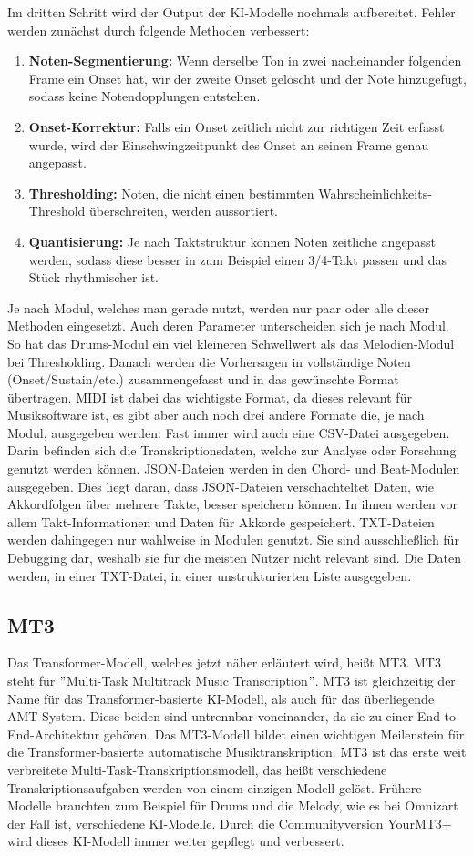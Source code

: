 Im dritten Schritt wird der Output der KI-Modelle nochmals aufbereitet.
Fehler werden zunächst durch folgende Methoden verbessert:
\begin{enumerate}
    \item \textbf{Noten-Segmentierung:} Wenn derselbe Ton in zwei nacheinander folgenden Frame ein Onset hat, wir der zweite Onset gelöscht und der Note hinzugefügt, sodass keine Notendopplungen entstehen.
    \item \textbf{Onset-Korrektur:} Falls ein Onset zeitlich nicht zur richtigen Zeit erfasst wurde, wird der Einschwingzeitpunkt des Onset an seinen Frame genau angepasst.
    \item \textbf{Thresholding:} Noten, die nicht einen bestimmten Wahrscheinlichkeits-Threshold überschreiten, werden aussortiert.
    \item \textbf{Quantisierung:} Je nach Taktstruktur können Noten zeitliche angepasst werden, sodass diese besser in zum Beispiel einen 3/4-Takt passen und das Stück rhythmischer ist.
\end{enumerate}
Je nach Modul, welches man gerade nutzt, werden nur paar oder alle dieser Methoden eingesetzt.
Auch deren Parameter unterscheiden sich je nach Modul.
So hat das Drums-Modul ein viel kleineren Schwellwert als das Melodien-Modul bei Thresholding.
Danach werden die Vorhersagen in vollständige Noten (Onset/Sustain/etc.)
zusammengefasst und in das gewünschte Format übertragen.
MIDI ist dabei das wichtigste Format, da dieses relevant für Musiksoftware ist,
es gibt aber auch noch drei andere Formate die, je nach Modul, ausgegeben werden.
Fast immer wird auch eine CSV-Datei ausgegeben.
Darin befinden sich die Transkriptionsdaten, welche zur Analyse oder Forschung genutzt werden können.
JSON-Dateien werden in den Chord- und Beat-Modulen ausgegeben.
Dies liegt daran, dass JSON-Dateien verschachteltet Daten, wie Akkordfolgen über mehrere Takte, besser speichern können.
In ihnen werden vor allem Takt-Informationen und Daten für Akkorde gespeichert.
TXT-Dateien werden dahingegen nur wahlweise in Modulen genutzt.
Sie sind ausschließlich für Debugging dar, weshalb sie für die meisten Nutzer nicht relevant sind.
Die Daten werden, in einer TXT-Datei, in einer unstrukturierten Liste ausgegeben.

\subsection{MT3}
Das Transformer-Modell, welches jetzt näher erläutert wird, heißt MT3.
MT3 steht für \("\)Multi-Task Multitrack Music Transcription\("\).
MT3 ist gleichzeitig der Name für das Transformer-basierte KI-Modell, als auch für das überliegende AMT-System.
Diese beiden sind untrennbar voneinander, da sie zu einer End-to-End-Architektur gehören.
Das MT3-Modell bildet einen wichtigen Meilenstein für die Transformer-basierte automatische Musiktranskription.
MT3 ist das erste weit verbreitete Multi-Task-Transkriptionsmodell,
das heißt verschiedene Transkriptionsaufgaben werden von einem einzigen Modell gelöst.
Frühere Modelle brauchten zum Beispiel für Drums und die Melody,
wie es bei Omnizart der Fall ist, verschiedene KI-Modelle.
Durch die Communityversion YourMT3+ wird dieses KI-Modell immer weiter gepflegt und verbessert.

